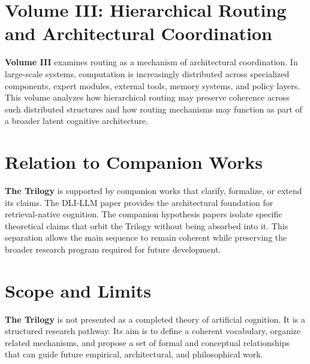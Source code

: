 \section{Volume III: Hierarchical Routing and Architectural Coordination}

\textbf{Volume III} examines routing as a mechanism of architectural coordination. In large-scale systems, computation is increasingly distributed across specialized components, expert modules, external tools, memory systems, and policy layers. This volume analyzes how hierarchical routing may preserve coherence across such distributed structures and how routing mechanisms may function as part of a broader latent cognitive architecture.

\section{Relation to Companion Works}

\textbf{The Trilogy} is supported by companion works that clarify, formalize, or extend its claims. The DLI-LLM paper provides the architectural foundation for retrieval-native cognition. The companion hypothesis papers isolate specific theoretical claims that orbit the Trilogy without being absorbed into it. This separation allows the main sequence to remain coherent while preserving the broader research program required for future development.

\section{Scope and Limits}

\textbf{The Trilogy} is not presented as a completed theory of artificial cognition. It is a structured research pathway. Its aim is to define a coherent vocabulary, organize related mechanisms, and propose a set of formal and conceptual relationships that can guide future empirical, architectural, and philosophical work.
